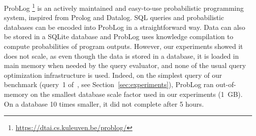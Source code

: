 ProbLog
\cite{DBLP:journals/tplp/FierensBRSGTJR15}\footnote{\url{https://dtai.cs.kuleuven.be/problog/}}
is an actively maintained and easy-to-use probabilistic programming
system, inspired from Prolog and Datalog. SQL queries
and probabilistic databases can be encoded into ProbLog in a
straightforward way. Data can also be stored in a
SQLite database and ProbLog uses knowledge compilation to compute
probabilities of program outputs. However, our experiments showed it does not
scale, as even though the data is stored in a
database, it is loaded in main memory when needed by the query evaluator,
and none of the usual query optimization infrastructure is used.
Indeed, on the simplest query of our benchmark (query~1 of~\qcust, see
Section~\ref{sec:experiments}), ProbLog ran out-of-memory on the smallest
database scale factor used in our experiments (1~GB). On a database 10
times smaller, it did not complete after 5 hours.
